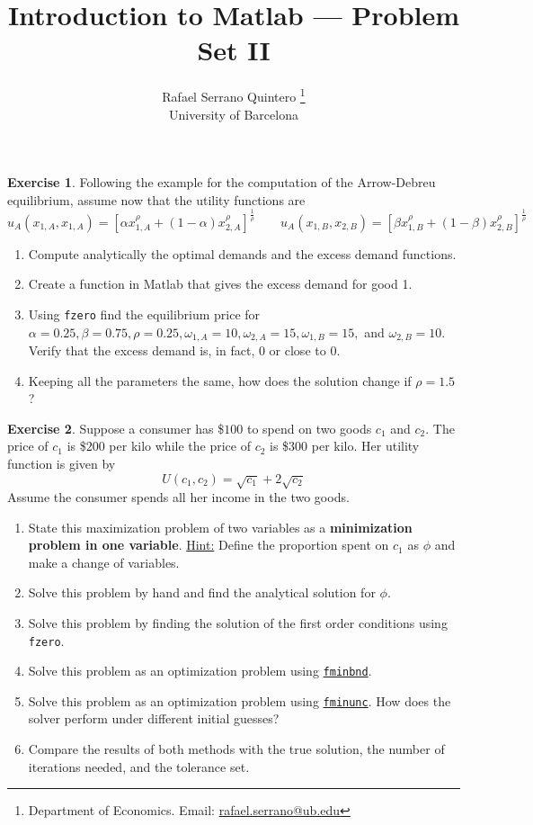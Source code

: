 \documentclass[a4paper,11pt]{article}
\title{\textbf{Introduction to Matlab --- Problem Set II}}
\author{Rafael Serrano Quintero
\thanks{Department of Economics. Email: \href{mailto:rafael.serrano@ub.edu}{rafael.serrano@ub.edu}} \\
University of Barcelona \\}
\date{}
\theoremstyle{definition}
\newtheorem{exercise}{Exercise}
\begin{document}
\VerbatimFootnotes

\maketitle

\begin{exercise}
  Following the example for the computation of the Arrow-Debreu equilibrium, assume now that the utility functions are 
  \[
    u_A(x_{1,A}, x_{1,A}) = \left[ \alpha x_{1,A}^{\rho} + (1 - \alpha) x_{2,A}^{\rho} \right]^{\frac{1}{\rho} } \qquad 
    u_A(x_{1,B}, x_{2,B}) = \left[ \beta x_{1,B}^{\rho} + (1 - \beta) x_{2,B}^{\rho} \right]^{\frac{1}{\rho} }
  \]
  \begin{enumerate}
    \item Compute analytically the optimal demands and the excess demand functions. 
    \item Create a function in Matlab that gives the excess demand for good 1. 
    \item Using \verb;fzero; find the equilibrium price for $\alpha = 0.25, \beta = 0.75, \rho = 0.25, \omega_{1,A} = 10, \omega_{2,A} = 15, \omega_{1,B} = 15,$ and $\omega_{2,B} = 10$. Verify that the excess demand is, in fact, $0$ or close to $0$.
    \item Keeping all the parameters the same, how does the solution change if $\rho = 1.5$?
  \end{enumerate}
\end{exercise}

\begin{exercise}
Suppose a consumer has \$$100$ to spend on two goods $c_1$ and $c_2$. The price of $c_1$ is \$$200$ per kilo while the price of $c_2$ is \$$300$ per kilo. Her utility function is given by
\[
U(c_1, c_2) = \sqrt{c_1} + 2\sqrt{c_2}
\]
Assume the consumer spends all her income in the two goods.
\begin{enumerate}
    \item State this maximization problem of two variables as a \textbf{minimization problem in one variable}. \underline{Hint:} Define the proportion spent on $c_1$ as $\phi$ and make a change of variables.
    \item Solve this problem by hand and find the analytical solution for $\phi$.
    \item Solve this problem by finding the solution of the first order conditions using \verb;fzero;.
    \item Solve this problem as an optimization problem using \href{https://es.mathworks.com/help/matlab/ref/fminbnd.html}{\texttt{fminbnd}}.
    \item Solve this problem as an optimization problem using \href{https://es.mathworks.com/help/optim/ug/fminunc.html}{\texttt{fminunc}}. How does the solver perform under different initial guesses?
    \item Compare the results of both methods with the true solution, the number of iterations needed, and the tolerance set.
\end{enumerate}
\end{exercise}
\end{document}
